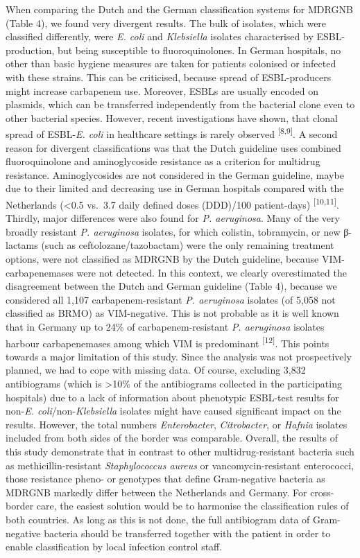 \documentclass[
]{book}
\begin{document}
When comparing the Dutch and the German classification systems for MDRGNB (Table 4), we found very divergent results. The bulk of isolates, which were classified differently, were \emph{E. coli} and \emph{Klebsiella} isolates characterised by ESBL-production, but being susceptible to fluoroquinolones. In German hospitals, no other than basic hygiene measures are taken for patients colonised or infected with these strains. This can be criticised, because spread of ESBL-producers might increase carbapenem use. Moreover, ESBLs are usually encoded on plasmids, which can be transferred independently from the bacterial clone even to other bacterial species. However, recent investigations have shown, that clonal spread of ESBL-\emph{E. coli} in healthcare settings is rarely observed \textsuperscript{{[}8,9{]}}. A second reason for divergent classifications was that the Dutch guideline uses combined fluoroquinolone and aminoglycoside resistance as a criterion for multidrug resistance. Aminoglycosides are not considered in the German guideline, maybe due to their limited and decreasing use in German hospitals compared with the Netherlands (\textless0.5 vs.~3.7 daily defined doses (DDD)/100 patient-days) \textsuperscript{{[}10,11{]}}. Thirdly, major differences were also found for \emph{P. aeruginosa}. Many of the very broadly resistant \emph{P. aeruginosa} isolates, for which colistin, tobramycin, or new β-lactams (such as ceftolozane/tazobactam) were the only remaining treatment options, were not classified as MDRGNB by the Dutch guideline, because VIM-carbapenemases were not detected. In this context, we clearly overestimated the disagreement between the Dutch and German guideline (Table 4), because we considered all 1,107 carbapenem-resistant \emph{P. aeruginosa} isolates (of 5,058 not classified as BRMO) as VIM-negative. This is not probable as it is well known that in Germany up to 24\% of carbapenem-resistant \emph{P. aeruginosa} isolates harbour carbapenemases among which VIM is predominant \textsuperscript{{[}12{]}}. This points towards a major limitation of this study. Since the analysis was not prospectively planned, we had to cope with missing data. Of course, excluding 3,832 antibiograms (which is \textgreater10\% of the antibiograms collected in the participating hospitals) due to a lack of information about phenotypic ESBL-test results for non-\emph{E. coli}/non-\emph{Klebsiella} isolates might have caused significant impact on the results. However, the total numbers \emph{Enterobacter}, \emph{Citrobacter}, or \emph{Hafnia} isolates included from both sides of the border was comparable. Overall, the results of this study demonstrate that in contrast to other multidrug-resistant bacteria such as methicillin-resistant \emph{Staphylococcus aureus} or vancomycin-resistant enterococci, those resistance pheno- or genotypes that define Gram-negative bacteria as MDRGNB markedly differ between the Netherlands and Germany. For cross-border care, the easiest solution would be to harmonise the classification rules of both countries. As long as this is not done, the full antibiogram data of Gram-negative bacteria should be transferred together with the patient in order to enable classification by local infection control staff.
\end{document}
